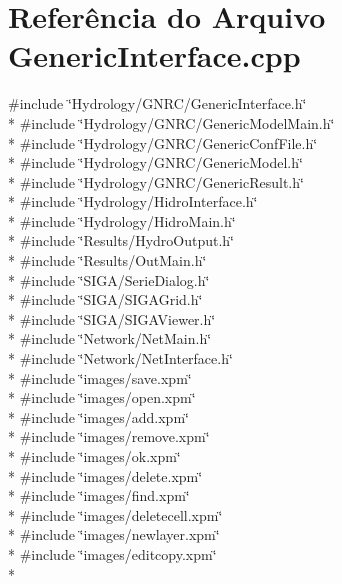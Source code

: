\section{Referência do Arquivo Generic\+Interface.\+cpp}
\label{_generic_interface_8cpp}
{\ttfamily \#include \char`\"{}Hydrology/\+G\+N\+R\+C/\+Generic\+Interface.\+h\char`\"{}}\\*
{\ttfamily \#include \char`\"{}Hydrology/\+G\+N\+R\+C/\+Generic\+Model\+Main.\+h\char`\"{}}\\*
{\ttfamily \#include \char`\"{}Hydrology/\+G\+N\+R\+C/\+Generic\+Conf\+File.\+h\char`\"{}}\\*
{\ttfamily \#include \char`\"{}Hydrology/\+G\+N\+R\+C/\+Generic\+Model.\+h\char`\"{}}\\*
{\ttfamily \#include \char`\"{}Hydrology/\+G\+N\+R\+C/\+Generic\+Result.\+h\char`\"{}}\\*
{\ttfamily \#include \char`\"{}Hydrology/\+Hidro\+Interface.\+h\char`\"{}}\\*
{\ttfamily \#include \char`\"{}Hydrology/\+Hidro\+Main.\+h\char`\"{}}\\*
{\ttfamily \#include \char`\"{}Results/\+Hydro\+Output.\+h\char`\"{}}\\*
{\ttfamily \#include \char`\"{}Results/\+Out\+Main.\+h\char`\"{}}\\*
{\ttfamily \#include \char`\"{}S\+I\+G\+A/\+Serie\+Dialog.\+h\char`\"{}}\\*
{\ttfamily \#include \char`\"{}S\+I\+G\+A/\+S\+I\+G\+A\+Grid.\+h\char`\"{}}\\*
{\ttfamily \#include \char`\"{}S\+I\+G\+A/\+S\+I\+G\+A\+Viewer.\+h\char`\"{}}\\*
{\ttfamily \#include \char`\"{}Network/\+Net\+Main.\+h\char`\"{}}\\*
{\ttfamily \#include \char`\"{}Network/\+Net\+Interface.\+h\char`\"{}}\\*
{\ttfamily \#include \char`\"{}images/save.\+xpm\char`\"{}}\\*
{\ttfamily \#include \char`\"{}images/open.\+xpm\char`\"{}}\\*
{\ttfamily \#include \char`\"{}images/add.\+xpm\char`\"{}}\\*
{\ttfamily \#include \char`\"{}images/remove.\+xpm\char`\"{}}\\*
{\ttfamily \#include \char`\"{}images/ok.\+xpm\char`\"{}}\\*
{\ttfamily \#include \char`\"{}images/delete.\+xpm\char`\"{}}\\*
{\ttfamily \#include \char`\"{}images/find.\+xpm\char`\"{}}\\*
{\ttfamily \#include \char`\"{}images/deletecell.\+xpm\char`\"{}}\\*
{\ttfamily \#include \char`\"{}images/newlayer.\+xpm\char`\"{}}\\*
{\ttfamily \#include \char`\"{}images/editcopy.\+xpm\char`\"{}}\\*
